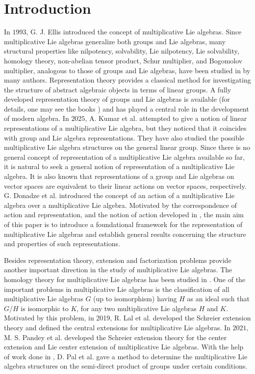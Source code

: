 \documentclass[10 pt,oneside,reqno,a4paper]{amsart}
\numberwithin{equation}{section}
\begin{document}
\section{Introduction}
In $1993$, G. J. Ellis \cite{GJ} introduced the concept of multiplicative Lie algebras. Since multiplicative Lie algebras generalize both groups and Lie algebras, many structural properties like nilpotency, solvability, Lie nilpotency, Lie solvability, homology theory, non-abelian tensor product, Schur multiplier, and Bogomolov multiplier, analogous to those of groups and Lie algebras, have been studied in \cite{AGNM, GNM, GNMA, GM, KJ, RS, MRS} by many authors. Representation theory provides a classical method for investigating the structure of abstract algebraic objects in terms of linear groups. A fully developed representation theory of groups and Lie algebras is available (for details, one may see the books \cite{EH, BS}) and has played a central role in the development of modern algebra. In $2025$, A. Kumar et al. \cite{KU} attempted to give a notion of linear representations of a multiplicative Lie algebra, but they noticed that it coincides with group and Lie algebra representations. They have also studied the possible multiplicative Lie algebra structures on the general linear group. Since there is no general concept of representation of a multiplicative Lie algebra available so far, it is natural to seek a general notion of representation of a multiplicative Lie algebra. It is also known that representations of a group and Lie algebras on vector spaces are equivalent to their linear actions on vector spaces, respectively. G. Donadze et al. \cite{GNM, GNMA} introduced the concept of an action of a multiplicative Lie algebra over a multiplicative Lie algebra.  Motivated by the correspondence of action and representation, and the notion of action developed in \cite{GNM, GNMA}, the main aim of this paper is to introduce a foundational framework for the representation of multiplicative Lie algebras and establish general results concerning the structure and properties of such representations.

Besides representation theory, extension and factorization problems provide another important direction in the study of multiplicative Lie algebras. The homology theory for multiplicative Lie algebras has been studied in \cite{AGNM}. 
One of the important problems in multiplicative Lie algebras is the classification of all multiplicative Lie algebras $G$ (up to isomorphism) having $H$ as an ideal such that $G/H$ is isomorphic to $K$, for any two multiplicative Lie algebras $H$ and $K$. Motivated by this problem, in 2019, R. Lal et al. \cite{RS} developed the Schreier extension theory and defined the central extensions for multiplicative Lie algebras. In $2021,$ M. S. Pandey et al. \cite{MS} developed the Schreier extension theory for the center extension and Lie center extension of multiplicative Lie algebras. With the help of work done in  \cite{MS}, D. Pal et al. \cite{DSS} gave a method to determine the multiplicative Lie algebra structures on the semi-direct product of groups under certain conditions.
\end{document}
